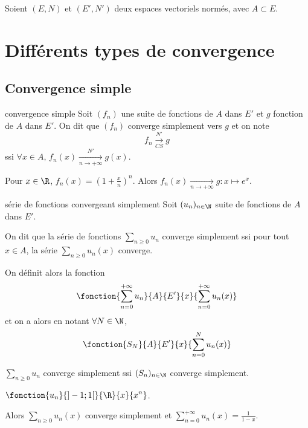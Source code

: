 Soient $(E, N)$ et $(E', N')$ deux espaces vectoriels normés, avec 
$A \subset E$.

\section{Différents types de convergence}
\subsection{Convergence simple }

\begin{definition}{convergence simple}{}
    Soit $(f_n)$ une suite de fonctions de $A$ dans $E'$ et $g$ fonction de $A$ dans $E'$. 
    On dit que $(f_n)$ converge simplement vers $g$ et on note 
    \[
        f_n \xrightarrow[CS]{N'} g 
    \]
    ssi $\forall x \in A, \, f_n(x) \xrightarrow[n\to +\infty]{N'} g(x)$.
\end{definition}

\begin{exemple}
    Pour $x \in \R$, $f_n(x) = \left( 1 + \frac x n \right)^n$.
    Alors $f_n(x) \xrightarrow[n\to +\infty]{} g : x \mapsto e^x$.
\end{exemple}

\begin{definition}{série de fonctions convergeant simplement}{}
    Soit $(u_n)_{n \in \N}$ suite de fonctions de $A$ dans $E'$.

    On dit que la série de fonctions $\displaystyle \sum_{n \geqslant 0} u_n$ converge simplement 
    ssi pour tout $x \in A$, la série $\displaystyle \sum_{n \geqslant 0} u_n(x)$ converge.

    On définit alors la fonction 
    \[
        \fonction{\sum_{n = 0 }^{ + \infty } u_n }{A}{E'}{x}{\sum_{n = 0}^{ + \infty } u_n(x)}
    \]
    et on a alors en notant $\forall N \in \N$, $$\fonction{S_N}{A}{E'}{x}{\sum_{n = 0}^N u_n(x)}$$

    $\displaystyle \sum_{n \geqslant 0} u_n$ converge simplement ssi $(S_n)_{n \in \N}$ converge simplement.

\end{definition}

\begin{exemple}
    $\displaystyle \fonction{u_n}{]-1; 1[}{\R}{x}{x^n}$.

    Alors $\displaystyle \sum_{n \geqslant 0} u_n(x)$ converge simplement et $\displaystyle \sum_{n = 0}^{ + \infty } u_n(x) = \frac{1}{1-x}$.
\end{exemple}


